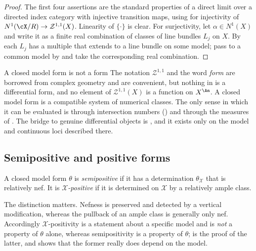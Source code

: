 \begin{proof}
The first four assertions are the standard properties of a direct limit over
a directed index category with injective transition maps, using
 for injectivity of
\(N^1(\cX/R)\to\mathcal Z^{1,1}(X)\).  Linearity of \(\{\cdot\}\) is clear.  For
surjectivity, let \(\alpha\in N^1(X)\) and write it as a finite real
combination of classes of line bundles \(L_j\) on \(X\).  By
 each \(L_j\) has a multiple that extends
to a line bundle on some model; pass to a common model by
 and take the corresponding real combination.
\end{proof}

\begin{warning}{A closed model form is not a form}
The notation \(\mathcal Z^{1,1}\) and the word \emph{form} are borrowed from
complex geometry and are convenient, but nothing in
 is a differential form, and no element of
\(\mathcal Z^{1,1}(X)\) is a function on \(X^{\An}\).  A closed model form is a
compatible system of numerical classes.  The only sense in which it can be
evaluated is through intersection numbers
() and through the measures of
.  The bridge to genuine differential objects is
, and it exists only on the model and
continuous loci described there.
\end{warning}

\subsection{Semipositive and positive forms}
\label{sec:ch20-semipositive-def}

\begin{definition}
\label{def:ch20-semipositive}
A closed model form \(\theta\) is \emph{semipositive} if it has a
determination \(\theta_{\mathcal X}\) that is relatively nef.  It is
\emph{\(\mathcal X\)-positive} if it is determined on \(\mathcal X\) by a
relatively ample class.
\end{definition}

The distinction matters.  Nefness is preserved and detected by a vertical
modification, whereas the pullback of an ample class is generally only nef.
Accordingly \(\mathcal X\)-positivity is a statement about a specific model
and is \emph{not} a property of \(\theta\) alone, whereas semipositivity is
a property of \(\theta\);  is the
proof of the latter, and  shows that the former
really does depend on the model.

